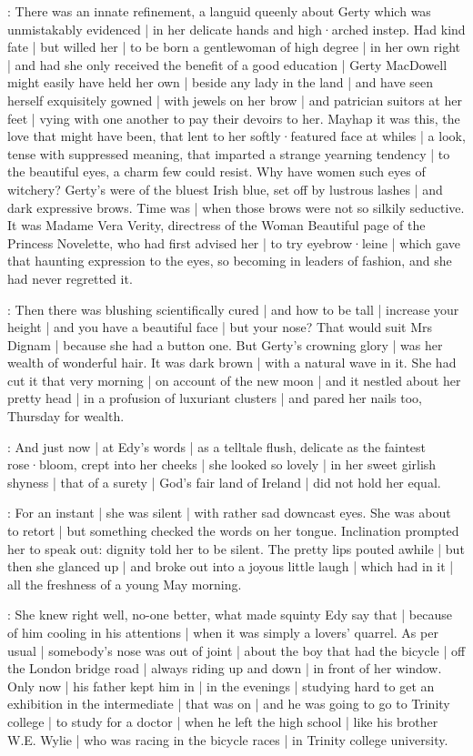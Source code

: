 \gertyNovel:
There was an innate refinement,
a languid queenly  about Gerty
which was unmistakably evidenced |
in her delicate hands
and high·arched instep.
Had kind fate |
but willed her |
to be born a gentlewoman of high degree |
in her own right |%
and had she only received the benefit of a good education |
Gerty MacDowell might easily have held her own |
beside any lady in the land |
and have seen herself exquisitely gowned |
with jewels on her brow |
and patrician suitors at her feet |
vying with one another to pay their devoirs to her.
Mayhap it was this,
the love that might have been,
that lent to her softly·featured face at whiles |
a look,
tense with suppressed meaning,
that imparted a strange yearning tendency |
to the beautiful eyes,
a charm few could resist.
Why have women such eyes of witchery?
Gerty's were of the bluest Irish blue,
set off by lustrous lashes |
and dark expressive brows.
Time was |
when those brows were not so silkily seductive.
It was Madame Vera Verity,%
directress of the Woman Beautiful page of the Princess Novelette,
who had first advised her |
to try eyebrow·leine |
which gave that haunting expression to the eyes,
so becoming in leaders of fashion,
and she had never regretted it.

\gertyReal:
Then there was blushing scientifically cured |
and how to be tall |
increase your height |
and you have a beautiful face |
but your nose?
That would suit Mrs Dignam |
because she had a button one.
But Gerty's crowning glory |
was her wealth of wonderful hair.
It was dark brown |
with a natural wave in it.
She had cut it that very morning |
on account of the new moon |
and it nestled about her pretty head |
in a profusion of luxuriant clusters |
and pared her nails too,
Thursday for wealth.

\gertyNovel:
And just now |
at Edy's words |
as a telltale flush,%
delicate as the faintest rose·bloom,
crept into her cheeks |
she looked so lovely |
in her sweet girlish shyness |
that of a surety |
God's fair land of Ireland |
did not hold her equal.

:
For an instant |
she was silent |
with rather sad downcast eyes.
She was about to retort |
but something checked the words on her tongue.
Inclination prompted her to speak out:
dignity told her to be silent.
The pretty lips pouted awhile |
but then she glanced up |
and broke out into a joyous little laugh |
which had in it |
all the freshness
of a young May morning.

\gertyReal:
She knew right well,
no-one better,
what made squinty Edy say that |
because of him cooling in his attentions |
when it was simply a lovers' quarrel.
As per usual |
somebody's nose was out of joint |%
about the boy that had the bicycle |
off the London bridge road |
always riding up and down |
in front of her window.
Only now |
his father kept him in |
in the evenings |
studying hard to get an exhibition in the intermediate |
that was on |
and he was going to go to Trinity college |
to study for a doctor |
when he left the high school |
like his brother W.E. Wylie |
who was racing in the bicycle races |
in Trinity college university.

